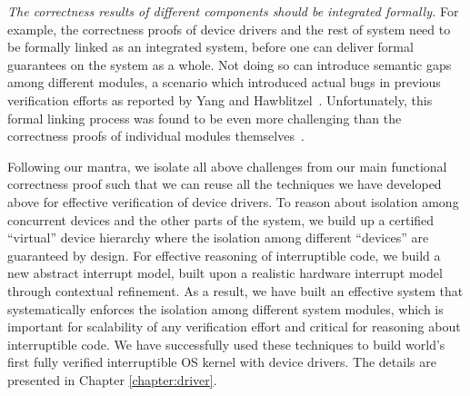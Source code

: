%
{\em The correctness results of different components should be
integrated formally.} For example, the correctness proofs of device
drivers and the rest of system
need to be formally linked as an integrated system,
before one can deliver formal guarantees on the system as a whole. Not
doing so can introduce semantic gaps among different modules,
a scenario which introduced actual bugs in previous verification
efforts as reported by Yang and Hawblitzel~\cite{hawblitzel10}. Unfortunately,
this formal linking process was found to be even more challenging than
the correctness proofs of individual modules
themselves~\cite{Alkassar:VSTTE08-225}. 

Following our mantra, we isolate all above challenges from our main
functional correctness proof such that we can reuse all the techniques
we have developed above for effective verification of device drivers.
To reason about isolation among concurrent devices and the other parts
of the system, we build up a certified ``virtual'' device hierarchy where
the isolation among different ``devices'' are guaranteed by design.
For effective reasoning of interruptible code, we build a new abstract
interrupt model, built upon a realistic
hardware interrupt model through contextual refinement.
As a result, we have built an effective system that systematically enforces the
isolation among different system modules, which is important
for scalability of any verification effort and critical for reasoning
about interruptible code. 
We have successfully used these techniques to build world's first fully verified
interruptible OS kernel with device drivers.
The details are presented in Chapter \ref{chapter:driver}.


